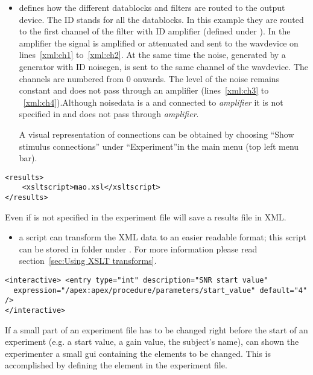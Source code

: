  

\begin{itemize}

\item {} defines how the different datablocks
and filters are routed to the output device. The ID 
stands for all the datablocks. In this example they are routed to
the first channel of the filter with ID {amplifier} (defined under
). In the amplifier the signal is amplified or
attenuated and sent to the wavdevice on lines~\ref{xml:ch1}
to~\ref{xml:ch2}. At the same time the noise, generated by a
generator with ID noisegen, is sent to the same channel of the
wavdevice. The channels are numbered from 0 onwards. The level of
the noise remains constant and does not pass through an amplifier
(lines~\ref{xml:ch3} to ~\ref{xml:ch4}).Although noisedata is a
 and connected to \emph{amplifier} it is not
specified in  and does not pass through
\emph{amplifier}.

A visual representation of connections can be obtained by choosing
``Show stimulus connections'' under ``Experiment''in the main
\apex menu (top left menu bar).

\end{itemize}
\begin{lstlisting}
<results>
    <xsltscript>mao.xsl</xsltscript>
</results>
\end{lstlisting}


 Even if  is not specified in
the experiment file \apex will save a results file in XML.

\begin{itemize}
\item {} a script can transform the XML data to
an easier readable format; this script can be stored in folder
 under \apex. For more information please read
section~\ref{sec:Using XSLT transforms}.
\end{itemize}

 

\begin{lstlisting}
<interactive> <entry type="int" description="SNR start value"
  expression="/apex:apex/procedure/parameters/start_value" default="4" />
</interactive>
\end{lstlisting}

If a small part of an experiment file has to be changed right
before the start of an experiment (e.g. a start value, a gain
value, the subject's name), \apex can shown the experimenter a
small \ac{gui} containing the elements to be changed. This is
accomplished by defining the  element in the
experiment file.

